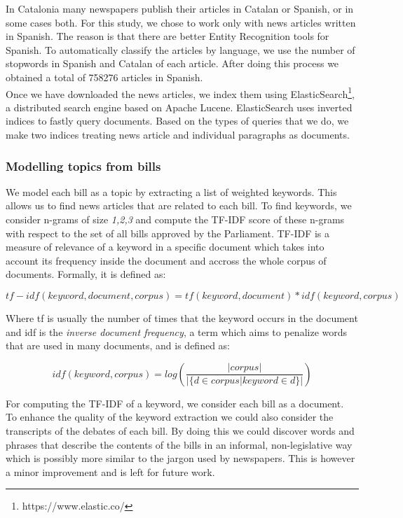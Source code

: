 In Catalonia many newspapers publish their articles in Catalan or Spanish, or in some cases both. For this study, we chose to work only with news articles written in Spanish. The reason is that there are better Entity Recognition tools for Spanish. To automatically classify the articles by language, we use the number of stopwords in Spanish and Catalan of each article. After doing this process we obtained a total of 758276 articles in Spanish. \\ 

Once we have downloaded the news articles, we index them using ElasticSearch\footnote{https://www.elastic.co/}, a distributed search engine based on Apache Lucene. ElasticSearch uses inverted indices to fastly query documents. Based on the types of queries that we do, we make two indices treating news article and individual paragraphs as documents.

\subsubsection{Modelling topics from bills}\label{subsec:extract_topic}

We model each bill as a topic by extracting a list of weighted keywords. This allows us to find news articles that are related to each bill. To find keywords, we consider n-grams of size \emph{1,2,3} and compute the TF-IDF score of these n-grams with respect to the set of all bills approved by the Parliament. TF-IDF is a measure of relevance of a keyword in a specific document which takes into account its frequency inside the document and accross the whole corpus of documents. Formally, it is defined as:

$$ tf-idf(keyword,document,corpus) = tf(keyword,document) * idf(keyword,corpus)$$

Where tf is usually the number of times that the keyword occurs in the document and idf is the \emph{inverse document frequency}, a term which aims to penalize words that are used in many documents, and is defined as:

$$ idf(keyword,corpus) = log(\frac{|corpus|}{|\{d \in corpus | keyword \in d\}|})$$

For computing the TF-IDF of a keyword, we consider each bill as a document. \\

To enhance the quality of the keyword extraction we could also consider the transcripts of the debates of each bill. By doing this we could discover words and phrases that describe the contents of the bills in an informal, non-legislative way which is possibly more similar to the jargon used by newspapers. This is however a minor improvement and is left for future work. \\

